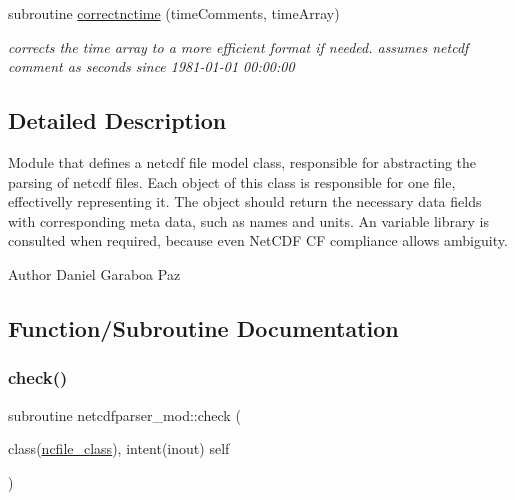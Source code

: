 \begin{DoxyCompactItemize}
subroutine \mbox{\hyperlink{namespacenetcdfparser__mod_af93319fde6cf6baedb7fe27bf3396e7b}{correctnctime}} (time\+Comments, time\+Array)
\begin{DoxyCompactList}\small\item\em corrects the time array to a more efficient format if needed. assumes netcdf comment as \textquotesingle{}seconds since 1981-\/01-\/01 00\+:00\+:00\textquotesingle{} \end{DoxyCompactList}\end{DoxyCompactItemize}


\subsection{Detailed Description}
Module that defines a netcdf file model class, responsible for abstracting the parsing of netcdf files. Each object of this class is responsible for one file, effectivelly representing it. The object should return the necessary data fields with corresponding meta data, such as names and units. An variable library is consulted when required, because even Net\+C\+DF CF compliance allows ambiguity. 

\begin{DoxyAuthor}{Author}
Daniel Garaboa Paz 
\end{DoxyAuthor}


\subsection{Function/\+Subroutine Documentation}
\mbox{\label{namespacenetcdfparser__mod_ae1a034f6540ac7a1ce7d0e3831bb2f03}} 
\subsubsection{\texorpdfstring{check()}{check()}}
{\footnotesize\ttfamily subroutine netcdfparser\+\_\+mod\+::check (\begin{DoxyParamCaption}\item[{class(\mbox{\hyperlink{structnetcdfparser__mod_1_1ncfile__class}{ncfile\+\_\+class}}), intent(inout)}]{self }\end{DoxyParamCaption})\hspace{0.3cm}{\ttfamily [private]}}



